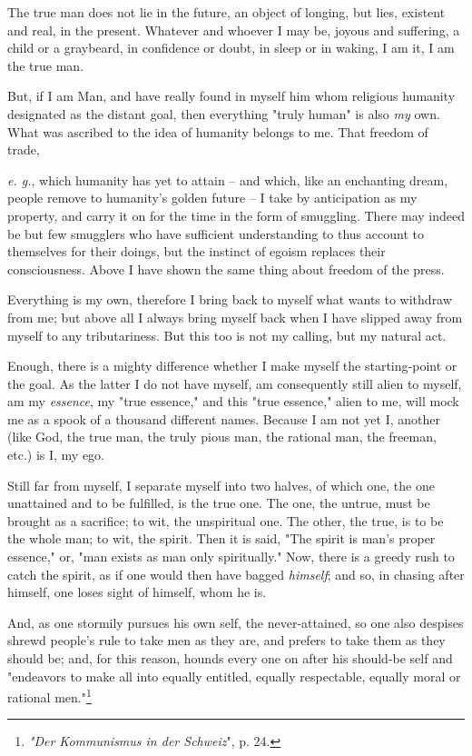\documentclass[a4paper]{book}
\begin{document}
The true man does not lie in the future, an object of longing, but lies, 
existent and real, in the present. Whatever and whoever I may be, joyous and 
suffering, a child or a graybeard, in confidence or doubt, in sleep or in 
waking, I am it, I am the true man.

But, if I am Man, and have really found in myself him whom religious humanity 
designated as the distant goal, then everything "{}truly human"{} is also 
\textit{my} own. What was ascribed to the idea of humanity belongs to me. That 
freedom of trade,

\textit{e. g.}, which humanity has yet to attain -- and which, like an 
enchanting dream, people remove to humanity's golden future -- I take by 
anticipation as my property, and carry it on for the time in the form of 
smuggling. There may indeed be but few smugglers who have sufficient 
understanding to thus account to themselves for their doings, but the instinct 
of egoism replaces their consciousness. Above I have shown the same thing 
about freedom of the press.

Everything is my own, therefore I bring back to myself what wants to withdraw 
from me; but above all I always bring myself back when I have slipped away 
from myself to any tributariness. But this too is not my calling, but my 
natural act.

Enough, there is a mighty difference whether I make myself the starting-point 
or the goal. As the latter I do not have myself, am consequently still alien 
to myself, am my \textit{essence}, my "{}true essence,"{} and this "{}true 
essence,"{} alien to me, will mock me as a spook of a thousand different 
names. Because I am not yet I, another (like God, the true man, the truly 
pious man, the rational man, the freeman, etc.) is I, my ego.

Still far from myself, I separate myself into two halves, of which one, the 
one unattained and to be fulfilled, is the true one. The one, the untrue, must 
be brought as a sacrifice; to wit, the unspiritual one. The other, the true, 
is to be the whole man; to wit, the spirit. Then it is said, "{}The spirit is 
man's proper essence,"{} or, "{}man exists as man only spiritually."{} Now, 
there is a greedy rush to catch the spirit, as if one would then have bagged 
\textit{himself}; and so, in chasing after himself, one loses sight of 
himself, whom he is.

And, as one stormily pursues his own self, the never-attained, so one also 
despises shrewd people's rule to take men as they are, and prefers to take 
them as they should be; and, for this reason, hounds every one on after his 
should-be self and "{}endeavors to make all into equally entitled, equally 
respectable, equally moral or rational men."{}\footnote{\textit{"{}Der 
Kommunismus in der Schweiz}"{}, p. 24.}
\end{document}
